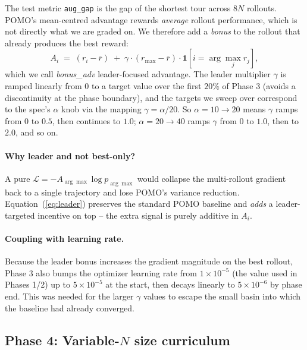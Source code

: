\documentclass[11pt,a4paper]{article}
\begin{document}
The test metric \texttt{aug\_gap} is the gap of the shortest tour across
$8N$ rollouts. POMO's mean-centred advantage rewards \emph{average} rollout
performance, which is not directly what we are graded on. We therefore add
a \emph{bonus} to the rollout that already produces the best reward:
%
\begin{equation}
   A_i \;=\; (r_i - \bar{r}) \;+\; \gamma \cdot (r_{\max} - \bar{r}) \cdot
   \mathbf{1}\!\left[i = \arg\max_{j} r_j\right],
   \label{eq:leader}
\end{equation}
%
which we call \emph{bonus\_adv} leader-focused advantage. The leader
multiplier $\gamma$ is ramped linearly from $0$ to a target value over the
first $20\%$ of Phase 3 (avoids a discontinuity at the phase boundary), and
the targets we sweep over correspond to the spec's $\alpha$ knob via the
mapping $\gamma = \alpha / 20$. So $\alpha=10\!\to\!20$ means $\gamma$
ramps from $0$ to $0.5$, then continues to $1.0$; $\alpha=20\!\to\!40$ ramps
$\gamma$ from $0$ to $1.0$, then to $2.0$, and so on.

\paragraph{Why leader and not best-only?} A pure
$\mathcal{L} = -A_{\arg\max} \log p_{\arg\max}$ would collapse the multi-rollout
gradient back to a single trajectory and lose POMO's variance reduction.
Equation~(\ref{eq:leader}) preserves the standard POMO baseline and
\emph{adds} a leader-targeted incentive on top -- the extra signal is purely
additive in $A_i$.

\paragraph{Coupling with learning rate.} Because the leader bonus increases
the gradient magnitude on the best rollout, Phase 3 also bumps the
optimizer learning rate from $1{\times}10^{-5}$ (the value used in
Phases 1/2) up to $5{\times}10^{-5}$ at the start, then decays linearly to
$5{\times}10^{-6}$ by phase end. This was needed for the larger $\gamma$
values to escape the small basin into which the baseline had already
converged.

\subsection{Phase 4: Variable-$N$ size curriculum}
\label{sec:phase4}
\end{document}
